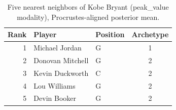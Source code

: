 \begin{table}[htbp]
  \centering\small
  \begin{tabular}{rllc}
    \toprule
    Rank & Player & Position & Archetype \\
    \midrule
    1 & Michael Jordan & G & 1 \\
    2 & Donovan Mitchell & G & 2 \\
    3 & Kevin Duckworth & C & 2 \\
    4 & Lou Williams & G & 2 \\
    5 & Devin Booker & G & 2 \\
    \bottomrule
  \end{tabular}
  \caption{Five nearest neighbors of Kobe Bryant (peak_value modality), Procrustes-aligned posterior mean.}
  \label{tab:Kobe_Bryant_neighbors_peak_value}
\end{table}

